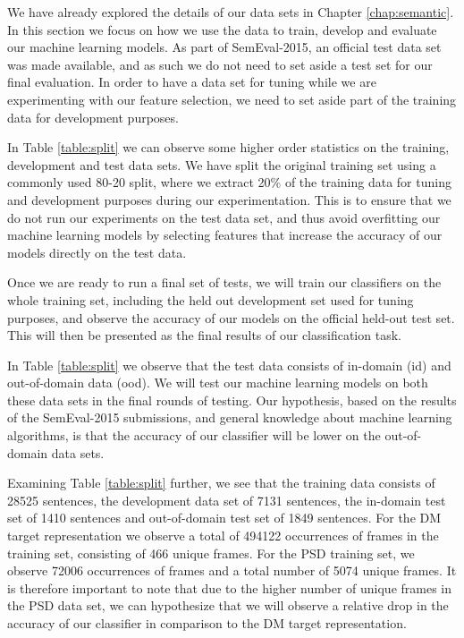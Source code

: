 We have already explored the details of our data sets in Chapter \ref{chap:semantic}. In this section we focus on how we use the data to train, develop and evaluate our machine learning models. As part of SemEval-2015, an official test data set was made available, and as such we do not need to set aside a test set for our final evaluation. In order to have a data set for tuning while we are experimenting with our feature selection, we need to set aside part of the training data for development purposes.

In Table \ref{table:split} we can observe some higher order statistics on the training, development and test data sets. We have split the original training set using a commonly used 80-20 split, where we extract 20\% of the training data for tuning and development purposes during our experimentation. This is to ensure that we do not run our experiments on the test data set, and thus avoid overfitting our machine learning models by selecting features that increase the accuracy of our models directly on the test data.

Once we are ready to run a final set of tests, we will train our classifiers on the whole training set, including the held out development set used for tuning purposes, and observe the accuracy of our models on the official held-out test set. This will then be presented as the final results of our classification task.

In Table \ref{table:split} we observe that the test data consists of in-domain (id) and out-of-domain data (ood). We will test our machine learning models on both these data sets in the final rounds of testing. Our hypothesis, based on the results of the SemEval-2015 submissions, and general knowledge about machine learning algorithms, is that the accuracy of our classifier will be lower on the out-of-domain data sets.

Examining Table \ref{table:split} further, we see that the training data consists of 28525 sentences, the development data set of 7131 sentences, the in-domain test set of 1410 sentences and out-of-domain test set of 1849 sentences. For the DM target representation we observe a total of 494122 occurrences of frames in the training set, consisting of 466 unique frames. For the PSD training set, we observe 72006 occurrences of frames and a total number of 5074 unique frames. It is therefore important to note that due to the higher number of unique frames in the PSD data set, we can hypothesize that we will observe a relative drop in the accuracy of our classifier in comparison to the DM target representation.

